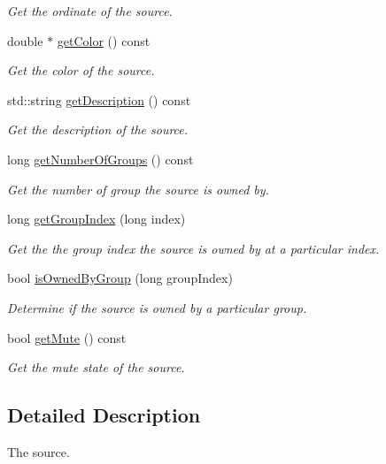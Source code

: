 \begin{DoxyCompactItemize}
\begin{DoxyCompactList}\small\item\em Get the ordinate of the source. \end{DoxyCompactList}\item 
double $\ast$ \hyperlink{class_hoa2_d_1_1_source_a4544d0ab2a4bc7c26e6b4597469321bf}{get\-Color} () const 
\begin{DoxyCompactList}\small\item\em Get the color of the source. \end{DoxyCompactList}\item 
std\-::string \hyperlink{class_hoa2_d_1_1_source_a96021e2cf9fc4077f822bb68fb4d9283}{get\-Description} () const 
\begin{DoxyCompactList}\small\item\em Get the description of the source. \end{DoxyCompactList}\item 
long \hyperlink{class_hoa2_d_1_1_source_a24ebd335837005f381291d30b55e7a93}{get\-Number\-Of\-Groups} () const 
\begin{DoxyCompactList}\small\item\em Get the number of group the source is owned by. \end{DoxyCompactList}\item 
long \hyperlink{class_hoa2_d_1_1_source_a3aaa2f340a459a69500a1909ae23f3b5}{get\-Group\-Index} (long index)
\begin{DoxyCompactList}\small\item\em Get the the group index the source is owned by at a particular index. \end{DoxyCompactList}\item 
bool \hyperlink{class_hoa2_d_1_1_source_a1f4a899282d443e61a71e0350261a727}{is\-Owned\-By\-Group} (long group\-Index)
\begin{DoxyCompactList}\small\item\em Determine if the source is owned by a particular group. \end{DoxyCompactList}\item 
bool \hyperlink{class_hoa2_d_1_1_source_addb6bdf4acf1f30fc50b255bdf0d73c4}{get\-Mute} () const 
\begin{DoxyCompactList}\small\item\em Get the mute state of the source. \end{DoxyCompactList}\end{DoxyCompactItemize}


\subsection{Detailed Description}
The source. 

